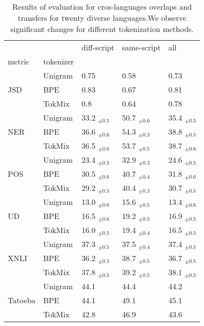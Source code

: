\begin{table}
\centering
\caption{Results of evaluation for cros-languages overlaps and transfers for twenty diverse languages.We observe significant changes for different tokenization methods.}
\label{tab:X_lang_20L}
\small
\begin{tabular}{lllll}
\toprule
        &        &       diff-script &       same-script &               all \\
metric & tokenizer &                   &                   &                   \\
\midrule
\multirow{3}{*}{JSD} & Unigram &              0.75 &              0.58 &              0.73 \\
        & BPE &              0.83 &              0.67 &              0.81 \\
        & TokMix &               0.8 &              0.64 &              0.78 \\
\cline{1-5}
\multirow{3}{*}{NER} & Unigram &  33.2 $_{\pm0.5}$ &  50.7 $_{\pm0.6}$ &  35.4 $_{\pm0.5}$ \\
        & BPE &  36.6 $_{\pm0.6}$ &  54.3 $_{\pm0.3}$ &  38.8 $_{\pm0.5}$ \\
        & TokMix &  36.5 $_{\pm0.6}$ &  53.7 $_{\pm0.5}$ &  38.7 $_{\pm0.6}$ \\
\cline{1-5}
\multirow{3}{*}{POS} & Unigram &  23.4 $_{\pm0.5}$ &  32.9 $_{\pm0.3}$ &  24.6 $_{\pm0.5}$ \\
        & BPE &  30.5 $_{\pm0.6}$ &  40.7 $_{\pm0.4}$ &  31.8 $_{\pm0.6}$ \\
        & TokMix &  29.2 $_{\pm0.5}$ &  40.4 $_{\pm0.3}$ &  30.7 $_{\pm0.5}$ \\
\cline{1-5}
\multirow{3}{*}{UD} & Unigram &  13.0 $_{\pm0.6}$ &  15.6 $_{\pm0.5}$ &  13.4 $_{\pm0.6}$ \\
        & BPE &  16.5 $_{\pm0.6}$ &  19.2 $_{\pm0.5}$ &  16.9 $_{\pm0.5}$ \\
        & TokMix &  16.0 $_{\pm0.5}$ &  19.4 $_{\pm0.4}$ &  16.5 $_{\pm0.5}$ \\
\cline{1-5}
\multirow{3}{*}{XNLI} & Unigram &  37.3 $_{\pm0.5}$ &  37.5 $_{\pm0.4}$ &  37.4 $_{\pm0.5}$ \\
        & BPE &  36.2 $_{\pm0.5}$ &  38.7 $_{\pm0.5}$ &  36.7 $_{\pm0.5}$ \\
        & TokMix &  37.8 $_{\pm0.5}$ &  39.2 $_{\pm0.5}$ &  38.1 $_{\pm0.5}$ \\
\cline{1-5}
\multirow{3}{*}{Tatoeba} & Unigram &              44.1 &              44.4 &              44.2 \\
        & BPE &              44.1 &              49.1 &              45.1 \\
        & TokMix &              42.8 &              46.9 &              43.6 \\
\bottomrule
\end{tabular}
\end{table}
